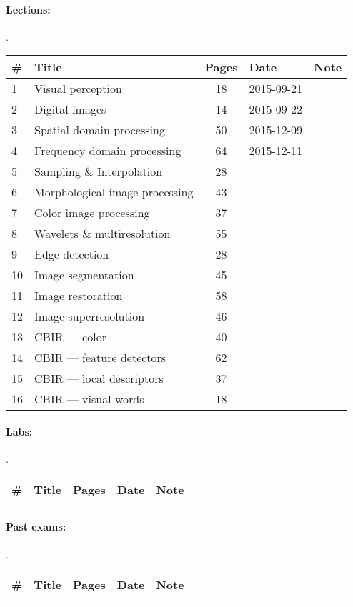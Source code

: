 \documentclass[a4paper,12pt]{article} %
\begin{document}
\paragraph{Lections:} .\\
\begin{tabularx}{\textwidth}{|l|X|c|l|c|}
	\hline
	\# & Title & Pages & Date & Note \\
	\hline
	1 & Visual perception & 18 & 2015-09-21 &  \\
	\hline
	2 & Digital images & 14 & 2015-09-22 &  \\
	\hline
	3 & Spatial domain processing & 50 & 2015-12-09 &  \\
	\hline
	4 & Frequency domain processing & 64 & 2015-12-11 &  \\
	\hline
	5 & Sampling \& Interpolation & 28 &  &  \\
	\hline
	6 & Morphological image processing & 43 &  &  \\
	\hline
	7 & Color image processing & 37 &  &  \\
	\hline
	8 & Wavelets \& multiresolution & 55 &  &  \\
	\hline
	9 & Edge detection & 28 &  &  \\
	\hline
	10 & Image segmentation & 45 &  &  \\
	\hline
	11 & Image restoration & 58 &  &  \\
	\hline
	12 & Image superresolution & 46 &  &  \\
	\hline
	13 & CBIR --- color & 40 &  &  \\
	\hline
	14 & CBIR --- feature detectors & 62 &  &  \\
	\hline
	15 & CBIR --- local descriptors & 37 &  &  \\
	\hline
	16 & CBIR --- visual words & 18 &  &  \\
	\hline
\end{tabularx}

\paragraph{Labs:}.\\
\begin{tabularx}{\textwidth}{|l|X|c|l|c|}
	\hline
	\# & Title & Pages & Date & Note \\
	\hline
	&  &  &  &  \\
	\hline
\end{tabularx}

\paragraph{Past exams:}.\\
\begin{tabularx}{\textwidth}{|l|X|c|l|c|}
	\hline
	\# & Title & Pages & Date & Note \\
	\hline
	&  &  &  &  \\
	\hline
\end{tabularx}
\end{document}
